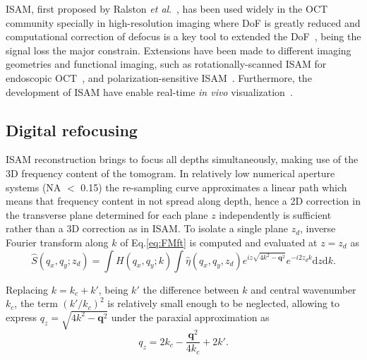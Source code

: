 ISAM, first proposed by Ralston \textit{et al}.~\cite{Ralston2006_Interferometric}, has been used widely in the OCT community specially in high-resolution imaging where DoF is greatly reduced and computational correction of defocus is a key tool to extended the DoF~\cite{Liu2014_Computed, Boppart2015_Computational, Yi2019_Structure, Zysk2015_Intraoperative}, being the signal loss the major constrain. Extensions have been made to different imaging geometries and functional imaging, such as rotationally-scanned ISAM for endoscopic OCT~\cite{Marks2006_Inverse-1, Marks2006_Inverse}, and polarization-sensitive ISAM~\cite{Davis2007_Polarimetric}. Furthermore, the development of ISAM have enable real-time \textit{in vivo} visualization~\cite{Ralston2008_Realtime, Ralston2013_Interferometric, St.Marie2013_Robust}. 

\subsection{Digital refocusing}

ISAM reconstruction brings to focus all depths simultaneously, making use of the 3D frequency content of the tomogram. In relatively low numerical aperture systems (NA $<$ 0.15) the re-sampling curve approximates a linear path which means that frequency content in not spread along depth, hence a 2D correction in the transverse plane determined for each plane $z$ independently is sufficient~\cite{Yasuno2006_Noniterative, South2016_Computed} rather than a 3D correction as in ISAM. To isolate a single plane $z_d$, inverse Fourier transform along $k$ of Eq.\eqref{eq:FMft} is computed and evaluated at $z=z_d$ as
\begin{equation}\label{eq:preDefocus}
    \hat{S}(q_x,q_y; z_d) = \int H(q_x, q_y; k) \int \hat{\eta}(q_x,q_y, z_d) e^{iz\sqrt{4k^2-\mathbf{q}^2}} e^{-i2z_dk} \text{d}z\text{d}k.
\end{equation}

Replacing $k=k_c + k'$, being $k'$ the difference between $k$ and central wavenumber $k_c$, the term $(k'/k_c)^2$ is relatively small enough to be neglected, allowing to express $q_z=\sqrt{4k^2-\mathbf{q}^2}$ under the paraxial approximation as~\cite{South2016_Computed}
\begin{equation}\label{eq:qzAprox}
    q_z = 2k_c - \frac{\mathbf{q}^2}{4k_c} + 2k'.
\end{equation}

